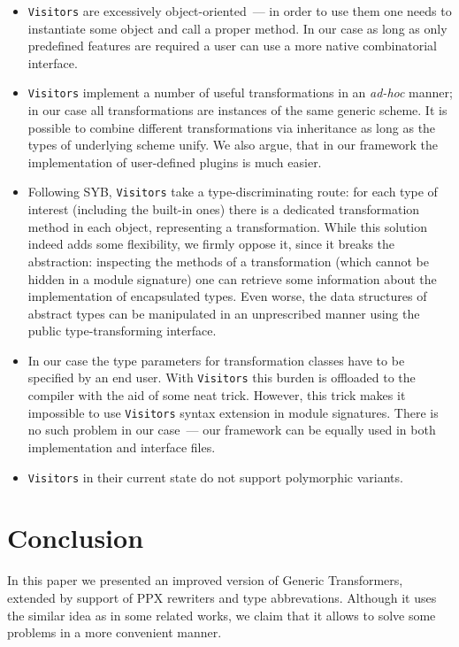 \documentclass[twocolumn,8pt]{extarticle}
\newcommand{\cd}[1]{\texttt{#1}}
\begin{document}
\begin{itemize}
   \item \cd{Visitors} are excessively object-oriented~--- in order to use them one needs to instantiate some object and call a proper method. In our case as long as
     only predefined features are required a user can use a more native combinatorial interface.
     
   \item \cd{Visitors} implement a number of useful transformations in an \emph{ad-hoc} manner; in our case all transformations are instances of the
     same generic scheme. It is possible to combine different transformations via inheritance as long as the types of underlying scheme unify. We also argue, that
     in our framework the implementation of user-defined plugins is much easier.
     
   \item Following SYB, \cd{Visitors} take a type-discriminating route: for each type of interest (including the built-in ones) there is a dedicated
     transformation method in each object, representing a transformation. While this solution indeed adds some flexibility, we firmly oppose it, since it
     breaks the abstraction: inspecting the methods of a transformation (which cannot be hidden in a module signature) one can retrieve some
     information about the implementation of encapsulated types. Even worse, the data structures of abstract types can be manipulated in an unprescribed
     manner using the public type-transforming interface.

   \item In our case the type parameters for transformation classes have to be specified by an end user. With \cd{Visitors} this burden is offloaded to the
     compiler with the aid of some neat trick. However, this trick makes it impossible to use \cd{Visitors} syntax extension in module signatures. There is no
     such problem in our case~--- our framework can be equally used in both implementation and interface files.

   \item \cd{Visitors} in their current state do not support polymorphic variants.
\end{itemize}

\section{Conclusion}
In this paper we presented an improved version of Generic Transformers, extended by support of PPX rewriters and type abbrevations. Although it 
uses the similar idea as in some related works, we claim that it allows to solve some problems in a more convenient manner.
\end{document}

